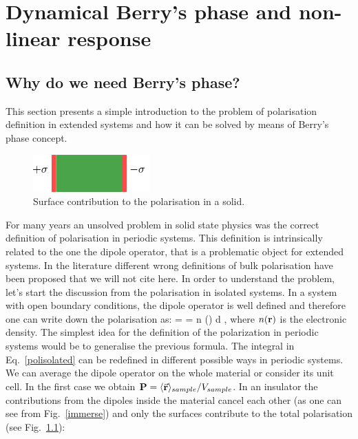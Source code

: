 \chapter{Dynamical Berry's phase and non-linear response} 
\label{chapterberry}
\section{Why do we need Berry's phase?}
This section presents a simple introduction to the problem of polarisation definition in extended systems and how it can be solved by means of Berry's phase concept.
\begin{figure}
  \begin{center}
    \includegraphics[width=0.4\textwidth]{Figures/wrong_polarization2}
  \end{center}
  \caption{Surface contribution to the polarisation in a solid. \label{surfacepol}}
\end{figure}
For many years an unsolved problem in solid state physics was the correct definition of polarisation in periodic systems.
This definition is intrinsically related to the one the dipole operator, that is a problematic object for extended systems.
In the literature different wrong definitions of bulk polarisation have been proposed that we will not cite here\cite{restanotes}.
In order to understand the problem, let's start the discussion from the polarisation in isolated systems.
In a system with open boundary conditions, the dipole operator is well defined and therefore one can write down the polarisation as:
\be
\PP =  = \int \vec \rr n (\rr) d \rr,
\label{polisolated}
\ee
where $n({\bf r})$ is the electronic density.
The simplest idea for the definition of the polarization in periodic systems would be to generalise the previous formula. The integral in Eq.~\ref{polisolated} can be redefined in different possible ways in periodic systems. We can average the dipole operator on the whole material or consider its unit cell. In the first case we obtain $ {\bf P} = \langle \vec {{\bf r}} \rangle_{sample}/V_{sample}$. In an insulator the contributions from the dipoles inside the material cancel each other (as one can see from  Fig.~\ref{immerse}) and only the surfaces contribute to the total polarisation (see Fig.~\ref{surfacepol}):                              
